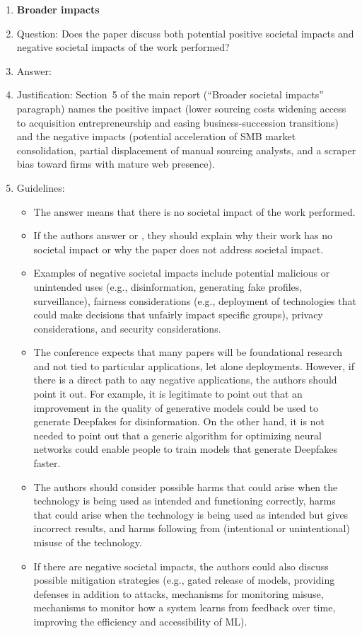 \documentclass{article}
\begin{document}
\begin{enumerate}
\item {\bf Broader impacts}
    \item[] Question: Does the paper discuss both potential positive societal impacts and negative societal impacts of the work performed?
    \item[] Answer: \answerYes{}
    \item[] Justification: Section~5 of the main report (``Broader societal impacts'' paragraph) names the positive impact (lower sourcing costs widening access to acquisition entrepreneurship and easing business-succession transitions) and the negative impacts (potential acceleration of SMB market consolidation, partial displacement of manual sourcing analysts, and a scraper bias toward firms with mature web presence).
    \item[] Guidelines:
    \begin{itemize}
        \item The answer \answerNA{} means that there is no societal impact of the work performed.
        \item If the authors answer \answerNA{} or \answerNo, they should explain why their work has no societal impact or why the paper does not address societal impact.
        \item Examples of negative societal impacts include potential malicious or unintended uses (e.g., disinformation, generating fake profiles, surveillance), fairness considerations (e.g., deployment of technologies that could make decisions that unfairly impact specific groups), privacy considerations, and security considerations.
        \item The conference expects that many papers will be foundational research and not tied to particular applications, let alone deployments. However, if there is a direct path to any negative applications, the authors should point it out. For example, it is legitimate to point out that an improvement in the quality of generative models could be used to generate Deepfakes for disinformation. On the other hand, it is not needed to point out that a generic algorithm for optimizing neural networks could enable people to train models that generate Deepfakes faster.
        \item The authors should consider possible harms that could arise when the technology is being used as intended and functioning correctly, harms that could arise when the technology is being used as intended but gives incorrect results, and harms following from (intentional or unintentional) misuse of the technology.
        \item If there are negative societal impacts, the authors could also discuss possible mitigation strategies (e.g., gated release of models, providing defenses in addition to attacks, mechanisms for monitoring misuse, mechanisms to monitor how a system learns from feedback over time, improving the efficiency and accessibility of ML).
    \end{itemize}


\end{enumerate}
\end{document}
